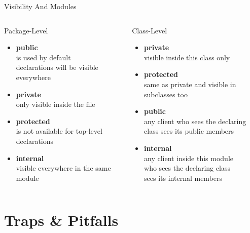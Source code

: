 \begin{frame}[fragile]{Visibility And Modules}
	\begin{columns}
		\begin{column}{0.45\textwidth}
			Package-Level
			\begin{itemize}
				\item \textbf{public}\\
				is used by default\\
				declarations will be visible everywhere
				\item \textbf{private}\\
				only visible inside the file
				\item \textbf{protected}\\
				is not available for top-level declarations
				\item \textbf{internal}\\
				visible everywhere in the same module
			\end{itemize}
		\end{column}
		\begin{column}{0.55\textwidth}
			Class-Level
			\begin{itemize}
				\item \textbf{private}\\
				visible inside this class only
				\item \textbf{protected}\\
				same as private and visible in subclasses too
				\item \textbf{public}\\
				any client who sees the declaring\\
				class sees its public members
				\item \textbf{internal}\\
				any client inside this module\\
				who sees the declaring class\\
				sees its internal members
			\end{itemize}
		\end{column}
	\end{columns}
\end{frame}

\section{Traps \& Pitfalls}

